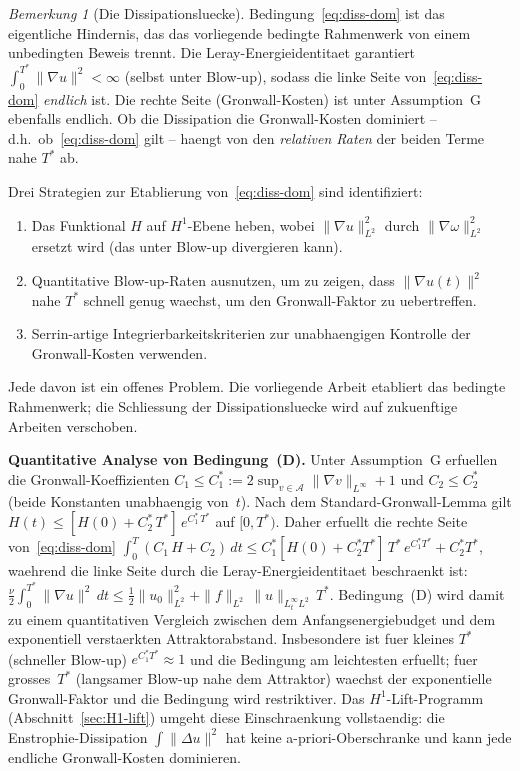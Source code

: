 \documentclass[12pt,a4paper]{article}
\theoremstyle{definition}
\theoremstyle{plain}
\theoremstyle{remark}
\newtheorem{remark}[definition]{Bemerkung}
\begin{document}
\begin{remark}[Die Dissipationsluecke]\label{rem:diss-gap}
Bedingung~\eqref{eq:diss-dom} ist das eigentliche Hindernis, das
das vorliegende bedingte Rahmenwerk von einem unbedingten Beweis trennt.
Die Leray-Energieidentitaet garantiert
$\int_0^{T^*}\|\nabla u\|^2 < \infty$ (selbst unter Blow-up), sodass
die linke Seite von~\eqref{eq:diss-dom} \emph{endlich} ist.
Die rechte Seite (Gronwall-Kosten) ist unter Assumption~G ebenfalls endlich.
Ob die Dissipation die Gronwall-Kosten dominiert -- d.h.\ ob~\eqref{eq:diss-dom} gilt -- haengt von den \emph{relativen Raten} der beiden Terme nahe $T^*$ ab.

Drei Strategien zur Etablierung von~\eqref{eq:diss-dom} sind identifiziert:
\begin{enumerate}
  \item[\textup{(i)}]  Das Funktional $H$ auf $H^1$-Ebene heben,
    wobei $\|\nabla u\|_{L^2}^2$ durch $\|\nabla\omega\|_{L^2}^2$
    ersetzt wird (das unter Blow-up divergieren kann).
  \item[\textup{(ii)}]  Quantitative Blow-up-Raten ausnutzen, um
    zu zeigen, dass $\|\nabla u(t)\|^2$ nahe $T^*$ schnell genug waechst,
    um den Gronwall-Faktor zu uebertreffen.
  \item[\textup{(iii)}]  Serrin-artige Integrierbarkeitskriterien
    zur unabhaengigen Kontrolle der Gronwall-Kosten verwenden.
\end{enumerate}
Jede davon ist ein offenes Problem. Die vorliegende Arbeit etabliert
das bedingte Rahmenwerk; die Schliessung der Dissipationsluecke wird
auf zukuenftige Arbeiten verschoben.

\medskip\noindent
\textbf{Quantitative Analyse von Bedingung~(D).}\;
Unter Assumption~G erfuellen die Gronwall-Koeffizienten
$C_1 \le C_1^* := 2\sup_{v\in\mathcal{A}}\|\nabla v\|_{L^\infty}+1$
und $C_2 \le C_2^*$ (beide Konstanten unabhaengig von~$t$).
Nach dem Standard-Gronwall-Lemma gilt
$H(t) \le [H(0)+C_2^*\,T^*]\,e^{C_1^*\,T^*}$
auf $[0,T^*)$. Daher erfuellt die rechte Seite
von~\eqref{eq:diss-dom}
$\int_0^T(C_1\,H+C_2)\,dt
\le C_1^*[H(0)+C_2^*T^*]\,T^*\,e^{C_1^*T^*} + C_2^*T^*$,
waehrend die linke Seite durch die Leray-Energieidentitaet beschraenkt ist:
$\frac{\nu}{2}\int_0^{T^*}\|\nabla u\|^2\,dt
\le \frac{1}{2}\|u_0\|^2_{L^2}
+ \|f\|_{L^2}\,\|u\|_{L^\infty_tL^2}\,T^*$.
Bedingung~(D) wird damit zu einem quantitativen Vergleich zwischen
dem Anfangsenergiebudget und dem exponentiell verstaerkten Attraktorabstand.
Insbesondere ist fuer kleines $T^*$ (schneller Blow-up)
$e^{C_1^*T^*} \approx 1$ und die Bedingung am leichtesten
erfuellt; fuer grosses~$T^*$ (langsamer Blow-up nahe dem Attraktor)
waechst der exponentielle Gronwall-Faktor und die Bedingung wird
restriktiver. Das $H^1$-Lift-Programm
(Abschnitt~\ref{sec:H1-lift}) umgeht diese Einschraenkung vollstaendig:
die Enstrophie-Dissipation $\int\|\Delta u\|^2$ hat
keine a-priori-Oberschranke und kann jede endliche Gronwall-Kosten dominieren.
\end{remark}
\end{document}
